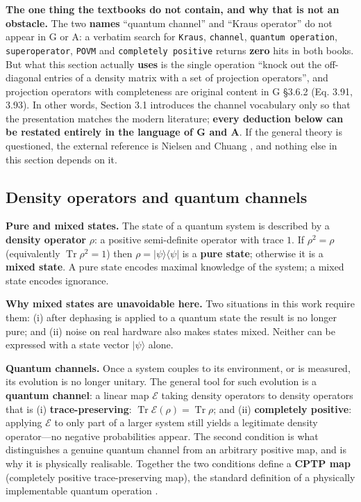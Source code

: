 \documentclass{article}
\begin{document}
\textbf{The one thing the textbooks do not contain, and why that is not
an obstacle.} The two \textbf{names} ``quantum channel'' and ``Kraus
operator'' do not appear in G or A: a verbatim search for
\texttt{Kraus}, \texttt{channel}, \texttt{quantum\ operation},
\texttt{superoperator}, \texttt{POVM} and \texttt{completely\ positive}
returns \textbf{zero} hits in both books. But what this section actually
\textbf{uses} is the single operation ``knock out the off-diagonal
entries of a density matrix with a set of projection operators'', and
projection operators with completeness are original content in G §3.6.2
(Eq. 3.91, 3.93). In other words, Section 3.1 introduces the channel
vocabulary only so that the presentation matches the modern literature;
\textbf{every deduction below can be restated entirely in the language
of G and A}. If the general theory is questioned, the external reference
is Nielsen and Chuang \cite{nielsen2010}, and nothing else in this
section depends on it.

\subsection{Density operators and quantum channels}

\textbf{Pure and mixed states.} The state of a quantum system is
described by a \textbf{density operator} \(\rho\): a positive
semi-definite operator with trace \(1\). If \(\rho^{2} = \rho\)
(equivalently \(\operatorname{Tr}\rho^{2} = 1\)) then
\(\rho = |\psi\rangle\langle\psi|\) is a \textbf{pure state}; otherwise
it is a \textbf{mixed state}. A pure state encodes maximal knowledge of
the system; a mixed state encodes ignorance.

\textbf{Why mixed states are unavoidable here.} Two situations in this
work require them: (i) after dephasing is applied to a quantum state the
result is no longer pure; and (ii) noise on real hardware also makes
states mixed. Neither can be expressed with a state vector
\(|\psi\rangle\) alone.

\textbf{Quantum channels.} Once a system couples to its environment, or
is measured, its evolution is no longer unitary. The general tool for
such evolution is a \textbf{quantum channel}: a linear map
\(\mathcal{E}\) taking density operators to density operators that is
(i) \textbf{trace-preserving}:
\(\operatorname{Tr}\mathcal{E}(\rho) = \operatorname{Tr}\rho\); and (ii)
\textbf{completely positive}: applying \(\mathcal{E}\) to only part of a
larger system still yields a legitimate density operator---no negative
probabilities appear. The second condition is what distinguishes a
genuine quantum channel from an arbitrary positive map, and is why it is
physically realisable. Together the two conditions define a \textbf{CPTP
map} (completely positive trace-preserving map), the standard definition
of a physically implementable quantum operation \cite{nielsen2010}.
\end{document}

